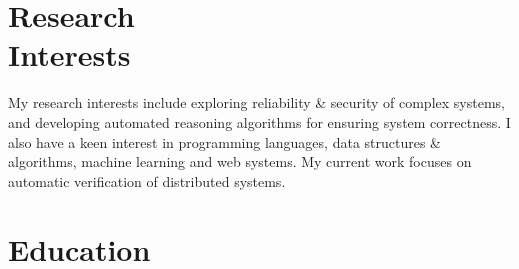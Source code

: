 \documentclass[margin,line,letter]{resume}
\begin{document}
\begin{resume}

\section{\mysidestyle Research\\Interests}
    My research interests include exploring reliability \& security of complex systems, and developing automated reasoning algorithms for ensuring system correctness. I also have a keen interest in programming languages, data structures \& algorithms, machine learning and web systems. My current work focuses on automatic verification of distributed systems.


\section{\mysidestyle Education}


\end{resume}
\end{document}
